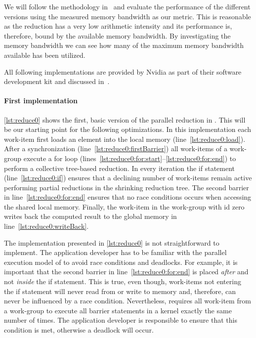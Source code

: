 We will follow the methodology in~\cite{Harris2007} and evaluate the performance of the different versions using the measured memory bandwidth as our metric.
This is reasonable as the reduction has a very low arithmetic intensity and its performance is, therefore, bound by the available memory bandwidth.
By investigating the memory bandwidth we can see how many of the maximum memory bandwidth available has been utilized.

All following implementations are provided by Nvidia as part of their software development kit and discussed in~\cite{Harris2007}.

\paragraph{First \OpenCL implementation}
\autoref{lst:reduce0} shows the first, basic version of the parallel reduction in \OpenCL.
This will be our starting point for the following optimizations.
In this implementation each work-item first loads an element into the local memory (line~\ref{lst:reduce0:load}).
After a synchronization (line~\ref{lst:reduce0:firstBarrier}) all work-items of a work-group execute a for loop (lines~\ref{lst:reduce0:for:start}--\ref{lst:reduce0:for:end}) to perform a collective tree-based reduction.
In every iteration the if statement (line~\ref{lst:reduce0:if}) ensures that a declining number of work-items remain active performing partial reductions in the shrinking reduction tree.
The second barrier in line~\ref{lst:reduce0:for:end} ensures that no race conditions occurs when accessing the shared local memory.
Finally, the work-item in the work-group with id zero writes back the computed result to the global memory in line~\ref{lst:reduce0:writeBack}.

The implementation presented in \autoref{lst:reduce0} is not straightforward to implement.
The application developer has to be familiar with the parallel execution model of \OpenCL to avoid race conditions and deadlocks.
For example, it is important that the second barrier in line~\ref{lst:reduce0:for:end} is placed \emph{after} and not \emph{inside} the if statement.
This is true, even though, work-items not entering the if statement will never read from or write to memory and, therefore, can never be influenced by a race condition.
Nevertheless, \OpenCL requires all work-item from a work-group to execute all barrier statements in a kernel exactly the same number of times.
The application developer is responsible to ensure that this condition is met, otherwise a deadlock will occur.

